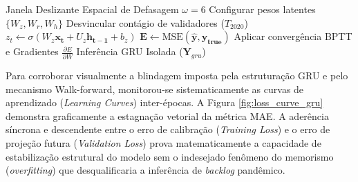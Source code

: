 \begin{algorithm}[H]
\caption{Retropropagação BPTT com Walk-Forward}
\begin{algorithmic}[1]
\Require Janela Deslizante Espacial de Defasagem $\omega=6$ 
\State Configurar pesos latentes $\{W_z, W_r, W_h\}$
    \State Desvincular contágio de validadores ($T_{2020}$)
        \State $z_t \leftarrow \sigma(W_z \mathbf{x_t} + U_z \mathbf{h_{t-1}} + b_z)$
        \State $\mathbf{E} \leftarrow \text{MSE}(\mathbf{\hat{y}}, \mathbf{y_{true}})$
        \State Aplicar convergência BPTT e Gradientes $\frac{\partial E}{\partial W}$
    \EndFor
\EndFor
\Ensure Inferência GRU Isolada ($\mathbf{Y}_{gru}$)
\end{algorithmic}
\label{alg:gru_process}
\end{algorithm}

Para corroborar visualmente a blindagem imposta pela estruturação GRU e pelo mecanismo Walk-forward, monitorou-se sistematicamente as curvas de aprendizado (\textit{Learning Curves}) inter-épocas. A Figura \ref{fig:loss_curve_gru} demonstra graficamente a estagnação vetorial da métrica MAE. A aderência síncrona e descendente entre o erro de calibração (\textit{Training Loss}) e o erro de projeção futura (\textit{Validation Loss}) prova matematicamente a capacidade de estabilização estrutural do modelo sem o indesejado fenômeno do memorismo (\textit{overfitting}) que desqualificaria a inferência de \textit{backlog} pandêmico.

